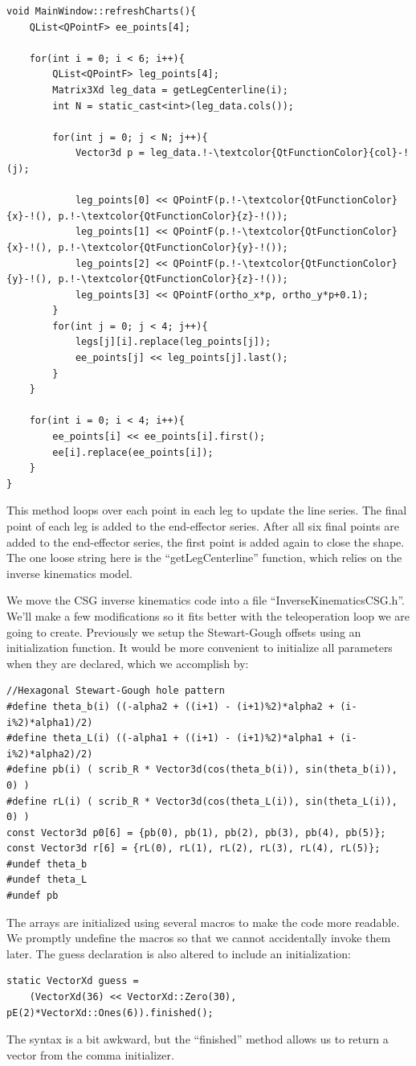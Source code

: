 \documentclass[12pt]{article}
\begin{document}
\begin{lstlisting}
void MainWindow::refreshCharts(){
    QList<QPointF> ee_points[4];

    for(int i = 0; i < 6; i++){
        QList<QPointF> leg_points[4];
        Matrix3Xd leg_data = getLegCenterline(i);
        int N = static_cast<int>(leg_data.cols());

        for(int j = 0; j < N; j++){
            Vector3d p = leg_data.!-\textcolor{QtFunctionColor}{col}-!(j);

            leg_points[0] << QPointF(p.!-\textcolor{QtFunctionColor}{x}-!(), p.!-\textcolor{QtFunctionColor}{z}-!());
            leg_points[1] << QPointF(p.!-\textcolor{QtFunctionColor}{x}-!(), p.!-\textcolor{QtFunctionColor}{y}-!());
            leg_points[2] << QPointF(p.!-\textcolor{QtFunctionColor}{y}-!(), p.!-\textcolor{QtFunctionColor}{z}-!());
            leg_points[3] << QPointF(ortho_x*p, ortho_y*p+0.1);
        }
        for(int j = 0; j < 4; j++){
            legs[j][i].replace(leg_points[j]);
            ee_points[j] << leg_points[j].last();
        }
    }

    for(int i = 0; i < 4; i++){
        ee_points[i] << ee_points[i].first();
        ee[i].replace(ee_points[i]);
    }
}
\end{lstlisting}
This method loops over each point in each leg to update the line series. The final point of each leg is added to the end-effector series. After all six final points are added to the end-effector series, the first point is added again to close the shape. The one loose string here is the ``getLegCenterline'' function, which relies on the inverse kinematics model.

We move the CSG inverse kinematics code into a file ``InverseKinematicsCSG.h''. We'll make a few modifications so it fits better with the teleoperation loop we are going to create. Previously we setup the Stewart-Gough offsets using an initialization function. It would be more convenient to initialize all parameters when they are declared, which we accomplish by:
\begin{lstlisting}
//Hexagonal Stewart-Gough hole pattern
#define theta_b(i) ((-alpha2 + ((i+1) - (i+1)%2)*alpha2 + (i-i%2)*alpha1)/2)
#define theta_L(i) ((-alpha1 + ((i+1) - (i+1)%2)*alpha1 + (i-i%2)*alpha2)/2)
#define pb(i) ( scrib_R * Vector3d(cos(theta_b(i)), sin(theta_b(i)), 0) )
#define rL(i) ( scrib_R * Vector3d(cos(theta_L(i)), sin(theta_L(i)), 0) )
const Vector3d p0[6] = {pb(0), pb(1), pb(2), pb(3), pb(4), pb(5)};
const Vector3d r[6] = {rL(0), rL(1), rL(2), rL(3), rL(4), rL(5)};
#undef theta_b
#undef theta_L
#undef pb
\end{lstlisting}
The arrays are initialized using several macros to make the code more readable. We promptly undefine the macros so that we cannot accidentally invoke them later. The guess declaration is also altered to include an initialization:
\begin{lstlisting}
static VectorXd guess =
    (VectorXd(36) << VectorXd::Zero(30), pE(2)*VectorXd::Ones(6)).finished();
\end{lstlisting}
The syntax is a bit awkward, but the ``finished'' method allows us to return a vector from the comma initializer.
\end{document}
